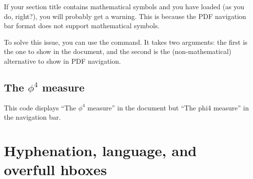 \begin{gotcha}
If your section title contains mathematical symbols
and you have  loaded (as you do, right?),
you will probably get a warning.
This is because the PDF navigation bar format does not support mathematical symbols.

To solve this issue, you can use the  command.
It takes two arguments: the first is the one to show in the document,
and the second is the (non-mathematical) alternative to show in PDF navigation.
\begin{ExampleCode}
\section{The \texorpdfstring{$\phi^4$}{phi4} measure}
\end{ExampleCode}
This code displays ``The $\phi^4$ measure'' in the document
but ``The phi4 measure'' in the navigation bar.
\end{gotcha}


%
%
%
\section{Hyphenation, language, and overfull hboxes}\label{sec:overfull}



